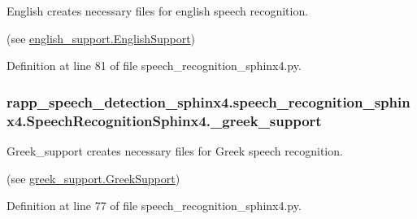 English creates necessary files for english speech recognition. 

(see \hyperlink{classrapp__speech__detection__sphinx4_1_1english__support_1_1EnglishSupport}{english\-\_\-support.\-English\-Support}) 

Definition at line 81 of file speech\-\_\-recognition\-\_\-sphinx4.\-py.

\hypertarget{classrapp__speech__detection__sphinx4_1_1speech__recognition__sphinx4_1_1SpeechRecognitionSphinx4_a4647fa82a552fe670b70550c5e66a253}{
\subsubsection[{\-\_\-greek\-\_\-support}]{\setlength{\rightskip}{0pt plus 5cm}rapp\-\_\-speech\-\_\-detection\-\_\-sphinx4.\-speech\-\_\-recognition\-\_\-sphinx4.\-Speech\-Recognition\-Sphinx4.\-\_\-greek\-\_\-support\hspace{0.3cm}{\ttfamily [private]}}}\label{classrapp__speech__detection__sphinx4_1_1speech__recognition__sphinx4_1_1SpeechRecognitionSphinx4_a4647fa82a552fe670b70550c5e66a253}


Greek\-\_\-support creates necessary files for Greek speech recognition. 

(see \hyperlink{classrapp__speech__detection__sphinx4_1_1greek__support_1_1GreekSupport}{greek\-\_\-support.\-Greek\-Support}) 

Definition at line 77 of file speech\-\_\-recognition\-\_\-sphinx4.\-py.

